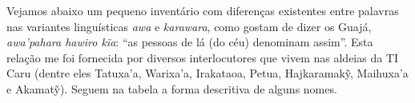 Vejamos abaixo um pequeno inventário com diferenças existentes entre
palavras nas variantes linguísticas \emph{awa} e \emph{karawara}, como
gostam de dizer os Guajá, \emph{awa'pahara hawiro kĩa}: ``as pessoas de
lá (do céu) denominam assim''. Esta relação me foi fornecida por
diversos interlocutores que vivem nas aldeias da TI Caru (dentre eles
Tatuxa'a, Warixa'a, Irakataoa, Petua, Hajkaramakỹ, Maihuxa'a e Akamatỹ).
Seguem na tabela a forma descritiva de alguns nomes.


